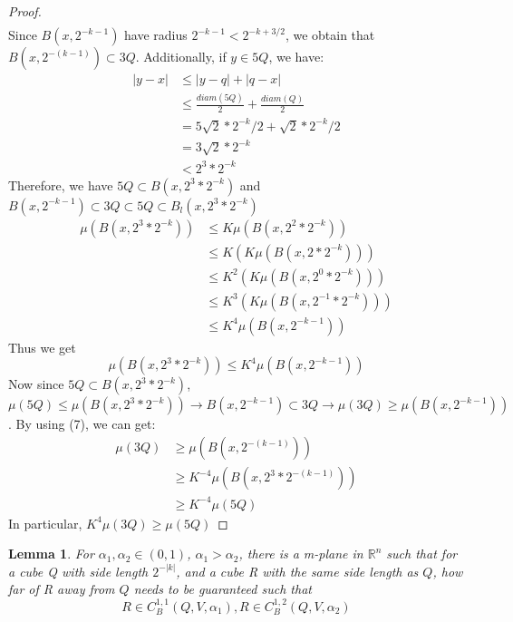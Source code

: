 \documentclass{article}
\newtheorem{lemma}{Lemma}
\begin{document}
\begin{proof}
\begin{equation*}
\begin{aligned}
    \end{aligned}
\end{equation*}
Since $B(x , 2^{-k-1})$ have radius $2^{-k-1} < 2^{-k + 3/2}$, we obtain that $B(x,2^{-(k-1)}) \subset 3Q$. Additionally, if $y \in 5Q$, we have:
\begin{equation*}
    \begin{aligned}
        |y - x| & \leq |y - q| + |q - x| \\
        & \leq \frac{diam(5Q)}{2} + \frac{diam(Q)}{2} \\
        & =5\sqrt{2}*2^{-k}/2 + \sqrt{2}*2^{-k}/2 \\
        & =3\sqrt{2}*2^{-k} \\
        & <2^3*2^{-k}
\end{aligned}
\end{equation*}
Therefore, we have $5Q \subset B(x,2^3*2^{-k})$ and $B(x,2^{-k-1}) \subset 3Q \subset 5Q \subset B_l(x, 2^3*2^{-k})$
\begin{equation*}
    \begin{aligned}
    \mu(B(x,2^3*2^{-k})) & \leq K\mu(B(x,2^2*2^{-k}))\\
    & \leq K(K\mu(B(x,2*2^{-k}))) \\
    & \leq K^2(K\mu(B(x,2^0*2^{-k}))) \\
    & \leq K^3(K\mu(B(x,2^{-1}*2^{-k}))) \\
    & \leq K^4\mu(B(x,2^{-k-1}))
\end{aligned} 
\end{equation*}
Thus we get
\begin{equation}
    \mu(B(x,2^3*2^{-k})) \leq K^4\mu(B(x,2^{-k-1}))
\end{equation}
Now since $5Q\subset B(x,2^3*2^{-k})$, $\mu(5Q)\leq \mu(B(x,2^3*2^{-k}))\rightarrow B(x,2^{-k-1}) \subset 3Q\rightarrow \mu(3Q) \geq \mu(B(x,2^{-k-1}))$. By using (7), we can get:\\
\begin{equation*}
    \begin{aligned}
        \mu(3Q) & \geq \mu(B(x,2^{-(k-1)})) \\
        & \geq K^{-4}\mu(B(x,2^3*2^{-(k-1)})) \\
        & \geq K^{-4}\mu(5Q)
    \end{aligned}
\end{equation*}
In particular, $K^4\mu(3Q)\geq\mu(5Q)$
\end{proof}

\begin{lemma}
For $\alpha_1,\alpha_2\in(0,1)$, $\alpha_1 > \alpha_2$, there is a m-plane in $\mathbb{R}^n$ such that for a cube Q with side length $2^{-|k|}$, and a cube R with the same side length as $Q$, how far of R away from $Q$ needs to be guaranteed such that \[R\in C^{1,1}_B(Q,V,\alpha_1), R\in C^{1,2}_B(Q,V,\alpha_2)\]\\
\end{lemma}
\end{document}

